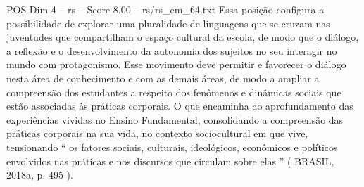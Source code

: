\begin{textsample}{POS Dim 4 – rs – Score 8.00 – rs/rs\_em\_64.txt}
Essa posição configura a possibilidade de explorar uma pluralidade de linguagens que se cruzam nas juventudes que compartilham o espaço cultural da escola, de modo que o diálogo, a reflexão e o desenvolvimento da autonomia dos sujeitos no seu interagir no mundo com protagonismo.
Esse movimento deve permitir e favorecer o diálogo nesta área de conhecimento e com as demais áreas, de modo a ampliar a compreensão dos estudantes a respeito dos fenômenos e dinâmicas sociais que estão associadas às práticas corporais.
O que encaminha ao aprofundamento das experiências vividas no Ensino Fundamental, consolidando a compreensão das práticas corporais na sua vida, no contexto sociocultural em que vive, tensionando “ os fatores sociais, culturais, ideológicos, econômicos e políticos envolvidos nas práticas e nos discursos que circulam sobre elas ” ( BRASIL, 2018a, p. 495 ).

\end{textsample}
